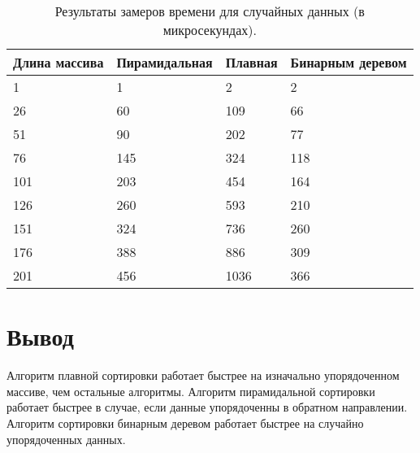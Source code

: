 \begin{table}[h]
	\begin{center}
		\captionsetup{justification=raggedright,singlelinecheck=off}
		\caption{\label{tbl:random}Результаты замеров времени для случайных данных (в микросекундах).}
		\begin{tabular}{|l|l|l|l|}
			
			\hline
			Длина массива&Пирамидальная&Плавная&Бинарным деревом\\
			\hline
			1 & 1 & 2 & 2 \\
			\hline
			26 & 60 & 109 & 66 \\
			\hline
			51 & 90 & 202 & 77 \\
			\hline
			76 & 145 & 324 & 118 \\
			\hline
			101 & 203 & 454 & 164 \\
			\hline
			126 & 260 & 593 & 210 \\
			\hline
			151 & 324 & 736 & 260 \\
			\hline
			176 & 388 & 886 & 309 \\
			\hline
			201 & 456 & 1036 & 366 \\
			\hline
			
		\end{tabular}
	\end{center}
\end{table}
\clearpage

\section*{Вывод}

Алгоритм плавной сортировки работает быстрее на изначально упорядоченном массиве, чем остальные алгоритмы. Алгоритм пирамидальной сортировки работает быстрее в случае, если данные упорядоченны в обратном направлении. Алгоритм сортировки бинарным деревом работает быстрее на случайно упорядоченных данных.


